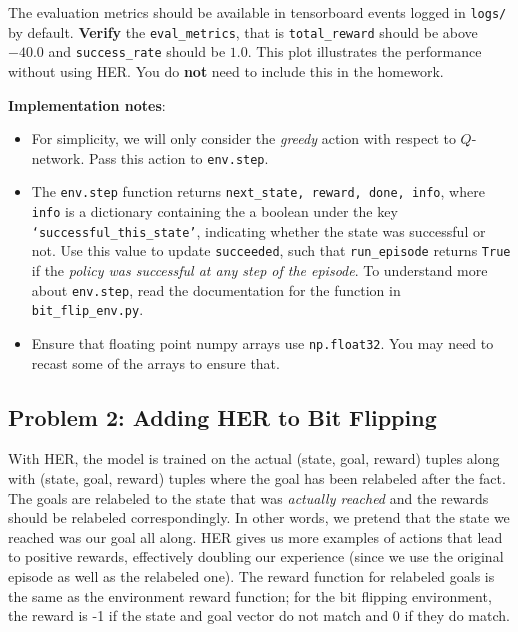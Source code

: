 \documentclass[12pt]{article}
\begin{document}
The evaluation metrics should be available in tensorboard events logged in \texttt{logs/} by default. \textbf{Verify} the \texttt{eval\_metrics}, that is \texttt{total\_reward} should be above $-40.0$ and \texttt{success\_rate} should be $1.0$. This plot illustrates the performance without using HER. You do \textbf{not} need to include this in the homework.

\textbf{Implementation notes}: 
\begin{itemize}
    \item For simplicity, we will only consider the \textit{greedy} action with respect to     $Q$-network. Pass this action to \texttt{env.step}.
    \item The \texttt{env.step} function returns \texttt{next\_state, reward, done, info}, where \texttt{info} is a dictionary containing the a boolean under the key \texttt{`successful\_this\_state'}, indicating whether the state was successful or not. Use this value to update \texttt{succeeded}, such that \texttt{run\_episode} returns \texttt{True} if the \textit{policy was successful at any step of the episode}. To understand more about \texttt{env.step}, read the documentation for the function in \texttt{bit\_flip\_env.py}.
    \item Ensure that floating point numpy arrays use \texttt{np.float32}. You may need to recast some of the arrays to ensure that.
\end{itemize}


\subsection*{Problem 2: Adding HER to Bit Flipping}
With HER, the model is trained on the actual (state, goal, reward) tuples along with (state, goal, reward) tuples where the goal has been relabeled after the fact. The goals are relabeled to the state that was \textit{actually reached} and the rewards should be relabeled correspondingly. In other words, we pretend that the state we reached was our goal all along. HER gives us more examples of actions that lead to positive rewards, effectively doubling our experience (since we use the original episode as well as the relabeled one). The reward function for relabeled goals is the same as the environment reward function; for the bit flipping environment, the reward is -1 if the state and goal vector do not match and 0 if they do match.
\end{document}

